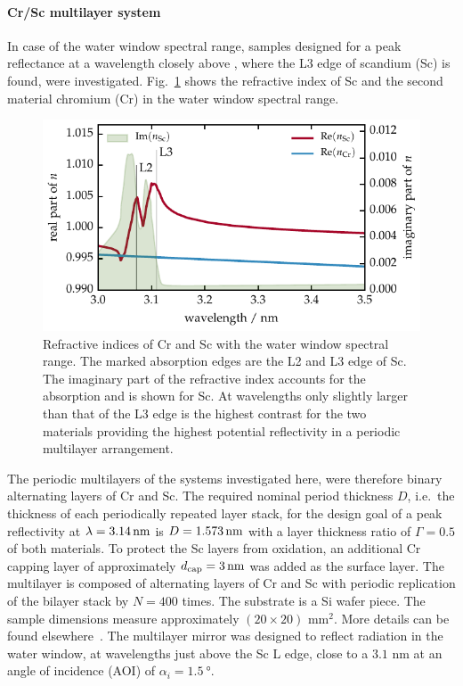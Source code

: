 \paragraph{Cr/Sc multilayer system}
In case of the water window spectral range, samples designed for a peak reflectance at a wavelength closely above , where the L3 edge of scandium (Sc) is found, were investigated. Fig.~\ref{ch_exp:fig_crsc_contrast} shows the refractive index of Sc and the second material chromium (Cr) in the water window spectral range. 
\begin{figure}[htb]
        \includegraphics{img/Cr_Sc_contrast}
        \caption[Refractive indices of Cr and Sc in the water window.]{%
            Refractive indices of Cr and Sc with the water window spectral range. The marked absorption edges are the L2 and L3 edge of Sc. The imaginary part of the refractive index accounts for the absorption and is shown for Sc. At wavelengths only slightly larger than that of the L3 edge is the highest contrast for the two materials providing the highest potential reflectivity in a periodic multilayer arrangement.}
        \label{ch_exp:fig_crsc_contrast}
\end{figure}
The periodic multilayers of the systems investigated here, were therefore binary alternating layers of Cr and Sc. The required nominal period thickness $D$, i.e.~the thickness of each periodically repeated layer stack, for the design goal of a peak reflectivity at $\lambda=\nm{3.14}$ is $D=\nm{1.573}$ with a layer thickness ratio of $\Gamma=0.5$ of both materials. To protect the Sc layers from oxidation, an additional Cr capping layer of approximately $d_\text{cap} = \nm{3}$ was added as the surface layer. The multilayer is composed of alternating layers of Cr and Sc with periodic replication of the bilayer stack by $N=400$ times. The substrate is a Si wafer piece. The sample dimensions measure 
approximately $(20 \times 20)$ mm$^2$. More details can be found elsewhere~\cite{prasciolu_thermal_2014}. The multilayer mirror was designed to reflect radiation in the water window, at wavelengths just above the Sc L edge, close to a $3.1$ nm at an angle of incidence (AOI) of $\alpha_i = \SI{1.5}{\degree}$.


